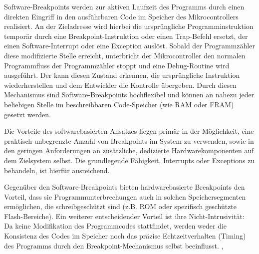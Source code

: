 Software-Breakpoints werden zur aktiven Laufzeit des Programms durch einen direkten Eingriff in den ausf\"uhrbaren Code im Speicher des Mikrocontrollers realisiert. An der Zieladresse wird hierbei die urspr\"ungliche Programminstruktion tempor\"ar durch eine Breakpoint-Instruktion oder einen Trap-Befehl ersetzt, der einen Software-Interrupt oder eine Exception ausl\"ost. Sobald der Programmz\"ahler diese modifizierte Stelle erreicht, unterbricht der Mikrocontroller den normalen Programmfluss der Programmz\"ahler stoppt und eine Debug-Routine wird ausgef\"uhrt. Der  kann diesen Zustand erkennen, die urspr\"ungliche Instruktion wiederherstellen und dem Entwickler die Kontrolle \"ubergeben. Durch diesen Mechanismus sind Software-Breakpoints hochflexibel und k\"onnen an nahezu jeder beliebigen Stelle im beschreibbaren Code-Speicher (wie RAM oder FRAM) gesetzt werden.

Die Vorteile des softwarebasierten Ansatzes liegen prim\"ar in der M\"oglichkeit, eine praktisch unbegrenzte Anzahl von Breakpoints im System zu verwenden, sowie in den geringen Anforderungen an zus\"atzliche, dedizierte Hardwarekomponenten auf dem Zielsystem selbst. Die grundlegende F\"ahigkeit, Interrupts oder Exceptions zu behandeln, ist hierf\"ur ausreichend. 

Gegen\"uber den Software-Breakpoints bieten hardwarebasierte Breakpoints den Vorteil, dass sie Programmunterbrechungen auch in solchen Speichersegmenten erm\"oglichen, die schreibgesch\"utzt sind (z.B. ROM oder spezifisch gesch\"utzte Flash-Bereiche). Ein weiterer entscheidender Vorteil ist ihre Nicht-Intrusivit\"at: Da keine Modifikation des Programmcodes stattfindet, werden weder die Konsistenz des Codes im Speicher noch das pr\"azise Echtzeitverhalten (Timing) des Programms durch den Breakpoint-Mechanismus selbst beeinflusst. , 

